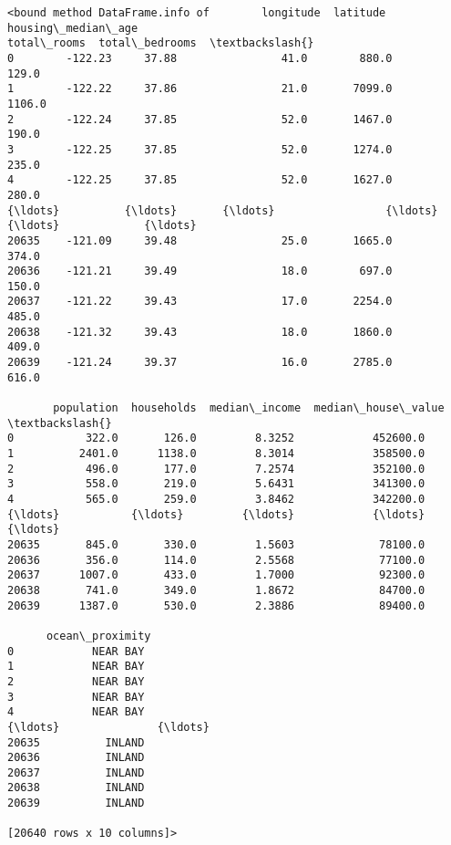 \documentclass[11pt]{article}
\newcommand{\prompt}[4]{
        \llap{{\color{#2}[#3]: #4}}\vspace{-1.25em}
    }
\begin{document}
            \begin{tcolorbox}[breakable, boxrule=.5pt, size=fbox, pad at break*=1mm, opacityfill=0]
\prompt{Out}{outcolor}{33}{\hspace{3.5pt}}
\begin{Verbatim}[commandchars=\\\{\}]
<bound method DataFrame.info of        longitude  latitude  housing\_median\_age
total\_rooms  total\_bedrooms  \textbackslash{}
0        -122.23     37.88                41.0        880.0           129.0
1        -122.22     37.86                21.0       7099.0          1106.0
2        -122.24     37.85                52.0       1467.0           190.0
3        -122.25     37.85                52.0       1274.0           235.0
4        -122.25     37.85                52.0       1627.0           280.0
{\ldots}          {\ldots}       {\ldots}                 {\ldots}          {\ldots}             {\ldots}
20635    -121.09     39.48                25.0       1665.0           374.0
20636    -121.21     39.49                18.0        697.0           150.0
20637    -121.22     39.43                17.0       2254.0           485.0
20638    -121.32     39.43                18.0       1860.0           409.0
20639    -121.24     39.37                16.0       2785.0           616.0

       population  households  median\_income  median\_house\_value  \textbackslash{}
0           322.0       126.0         8.3252            452600.0
1          2401.0      1138.0         8.3014            358500.0
2           496.0       177.0         7.2574            352100.0
3           558.0       219.0         5.6431            341300.0
4           565.0       259.0         3.8462            342200.0
{\ldots}           {\ldots}         {\ldots}            {\ldots}                 {\ldots}
20635       845.0       330.0         1.5603             78100.0
20636       356.0       114.0         2.5568             77100.0
20637      1007.0       433.0         1.7000             92300.0
20638       741.0       349.0         1.8672             84700.0
20639      1387.0       530.0         2.3886             89400.0

      ocean\_proximity
0            NEAR BAY
1            NEAR BAY
2            NEAR BAY
3            NEAR BAY
4            NEAR BAY
{\ldots}               {\ldots}
20635          INLAND
20636          INLAND
20637          INLAND
20638          INLAND
20639          INLAND

[20640 rows x 10 columns]>
\end{Verbatim}
\end{tcolorbox}
        
\end{document}
